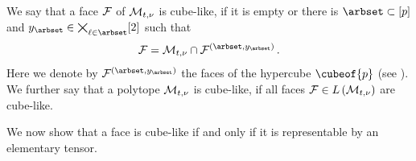 \begin{definition}
    \label{def:cubeLike}
    We say that a face $\mathcal{F}$ of $\mathcal{M}_{t,\nu}$ is cube-like, if it is empty or there is $\arbset\subset[\seldim]$ and $\headindexof{\arbset}\in\bigtimes_{\selindex\in\arbset}[2]$ such that
    \begin{align*}
        \facesymbol
        = \genmeanset \cap \facesymbolof{(\arbset,\headindexof{\arbset})} \, .
    \end{align*}
    Here we denote by $\facesymbolof{(\arbset,\headindexof{\arbset})}$ the faces of the hypercube $\cubeof{\seldim}$ (see ).
    We further say that a polytope $\mathcal{M}_{t,\nu}$ is cube-like, if all faces $\mathcal{F}\in L\left(\mathcal{M}_{t,\nu}\right)$ are cube-like.
\end{definition}

We now show that a face is cube-like if and only if it is representable by an elementary tensor.

